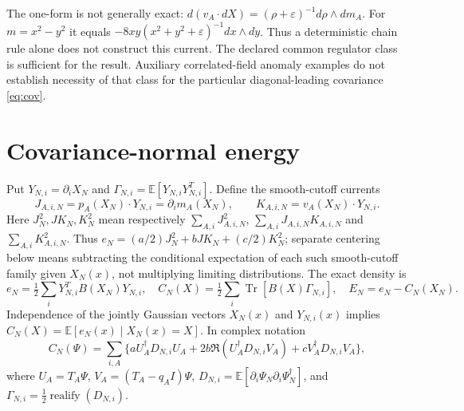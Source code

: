 \documentclass[11pt]{article}
\newcommand{\E}{\mathbb E}
\newcommand{\tr}{\operatorname{Tr}}
\newcommand{\eps}{\varepsilon}
\begin{document}
The one-form is not generally exact:
$d(v_A\cdot dX)=(\rho+\eps)^{-1}d\rho\wedge dm_A$.
For $m=x^2-y^2$ it equals $-8xy(x^2+y^2+\eps)^{-1}dx\wedge dy$.
Thus a deterministic chain rule alone does not construct this current.
The declared common regulator class is sufficient for the result. Auxiliary
correlated-field anomaly examples do not establish necessity of that class
for the particular diagonal-leading covariance \eqref{eq:cov}.

\section{Covariance-normal energy}
Put $Y_{N,i}=\partial_iX_N$ and
$\Gamma_{N,i}=\E[Y_{N,i}Y_{N,i}^T]$. Define the smooth-cutoff currents
\[
 J_{A,i,N}=p_A(X_N)\cdot Y_{N,i}=\partial_i m_A(X_N),\qquad
 K_{A,i,N}=v_A(X_N)\cdot Y_{N,i}.
\]
Here $J^2_N,JK_N,K^2_N$ mean respectively
$\sum_{A,i}J_{A,i,N}^2$, $\sum_{A,i}J_{A,i,N}K_{A,i,N}$ and
$\sum_{A,i}K_{A,i,N}^2$. Thus
$e_N=(a/2)J^2_N+bJK_N+(c/2)K^2_N$; separate centering below means
subtracting the conditional expectation of each such smooth-cutoff family
given $X_N(x)$, not multiplying limiting distributions.
The exact density is
\begin{equation}\label{eq:energy}
 e_N=\tfrac12\sum_iY_{N,i}^TB(X_N)Y_{N,i},\quad
 C_N(X)=\tfrac12\sum_i\tr[B(X)\Gamma_{N,i}],\quad E_N=e_N-C_N(X_N).
\end{equation}
Independence of the jointly Gaussian vectors $X_N(x)$ and $Y_{N,i}(x)$
implies $C_N(X)=\E[e_N(x)\mid X_N(x)=X]$. In complex notation
\begin{equation}\label{eq:complexct}
 C_N(\Psi)=\sum_{i,A}\{aU_A^\dagger D_{N,i}U_A
 +2b\Re(U_A^\dagger D_{N,i}V_A)+cV_A^\dagger D_{N,i}V_A\},
\end{equation}
where $U_A=T_A\Psi$, $V_A=(T_A-q_AI)\Psi$,
$D_{N,i}=\E[\partial_i\Psi_N\partial_i\Psi_N^\dagger]$, and
$\Gamma_{N,i}=\tfrac12\operatorname{realify}(D_{N,i})$.
\end{document}
